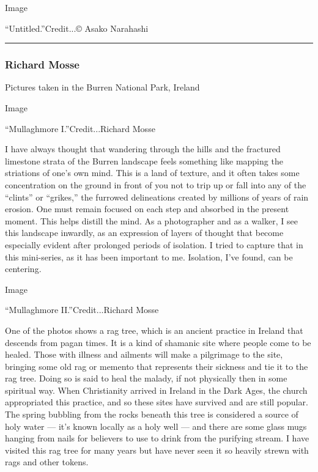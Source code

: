 Image

``Untitled.''Credit...© Asako Narahashi

\begin{center}\rule{0.5\linewidth}{\linethickness}\end{center}

\hypertarget{richard-mosse}{%
\subsubsection{Richard Mosse}\label{richard-mosse}}

Pictures taken in the Burren National Park, Ireland

Image

``Mullaghmore I.''Credit...Richard Mosse

I have always thought that wandering through the hills and the fractured
limestone strata of the Burren landscape feels something like mapping
the striations of one's own mind. This is a land of texture, and it
often takes some concentration on the ground in front of you not to trip
up or fall into any of the ``clints'' or ``grikes,'' the furrowed
delineations created by millions of years of rain erosion. One must
remain focused on each step and absorbed in the present moment. This
helps distill the mind. As a photographer and as a walker, I see this
landscape inwardly, as an expression of layers of thought that become
especially evident after prolonged periods of isolation. I tried to
capture that in this mini-series, as it has been important to me.
Isolation, I've found, can be centering.

Image

``Mullaghmore II.''Credit...Richard Mosse

One of the photos shows a rag tree, which is an ancient practice in
Ireland that descends from pagan times. It is a kind of shamanic site
where people come to be healed. Those with illness and ailments will
make a pilgrimage to the site, bringing some old rag or memento that
represents their sickness and tie it to the rag tree. Doing so is said
to heal the malady, if not physically then in some spiritual way. When
Christianity arrived in Ireland in the Dark Ages, the church
appropriated this practice, and so these sites have survived and are
still popular. The spring bubbling from the rocks beneath this tree is
considered a source of holy water --- it's known locally as a holy well
--- and there are some glass mugs hanging from nails for believers to
use to drink from the purifying stream. I have visited this rag tree for
many years but have never seen it so heavily strewn with rags and other
tokens.

